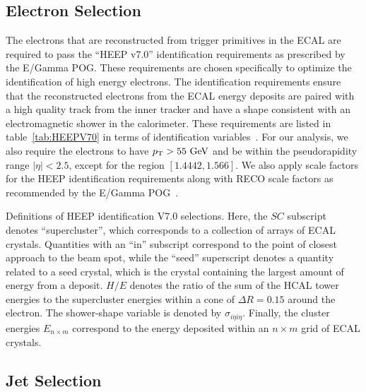 \subsection{Electron Selection}
\label{subsec:elecSelect}

The electrons that are reconstructed from trigger primitives in the ECAL are required to pass the ``HEEP v7.0'' identification requirements as prescribed by the E/Gamma POG. %
These requirements are chosen specifically to optimize the identification of high energy electrons.
The identification requirements ensure that the reconstructed electrons from the ECAL energy deposits are paired with a high quality track from the inner tracker and have a shape consistent with an electromagnetic shower in the calorimeter.
These requirements are listed in table~\ref{tab:HEEPV70} in terms of identification variables~\cite{CMSe}.
For our analysis, we also require the electrons to have $\pt>55\unit{GeV}$ and be within the pseudorapidity range $|\eta|<2.5$, except for the region $[1.4442,1.566]$. %
We also apply scale factors for the HEEP identification requirements along with RECO scale factors as recommended by the E/Gamma POG~\cite{EgammaScale}.

\begin{table}[htbp]
  \centering
  
  \caption{
    Definitions of HEEP identification V7.0 selections.
    Here, the $SC$ subscript denotes ``supercluster'', which corresponds to a collection of arrays of ECAL crystals.
    Quantities with an ``in'' subscript correspond to the point of closest approach to the beam spot, while the ``seed'' superscript denotes a quantity related to a seed crystal, which is the crystal containing the largest amount of energy from a deposit.
    $H/E$ denotes the ratio of the sum of the HCAL tower energies to the supercluster energies within a cone of $\Delta R=0.15$ around the electron.
    The shower-shape variable is denoted by $\sigma_{i\eta i\eta}$.
    Finally, the cluster energies $E_{n\times m}$ correspond to the energy deposited within an $n\times m$ grid of ECAL crystals.
  }
  \label{tab:HEEPV70}
\end{table}

\subsection{Jet Selection}
\label{subsec:jetSelect}

